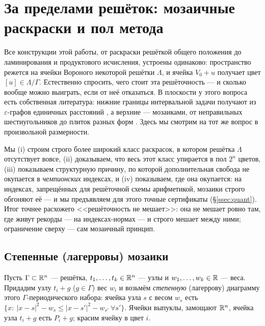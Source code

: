 \section{За пределами решёток: мозаичные раскраски и пол метода}
\label{sec:tilings}

Все конструкции этой работы, от раскраски решёткой общего положения до
ламинирования и продуктового исчисления, устроены одинаково: пространство
режется на ячейки Вороного некоторой решётки $\Lambda$, и ячейка
$V_0+u$ получает цвет $[u]\in\Lambda/\Gamma$. Естественно спросить, чего стоит
эта решёточность --- и сколько вообще можно выиграть, если от неё отказаться.
В плоскости у этого вопроса есть собственная литература: нижние границы
интервальной задачи получают из $\varepsilon$-графов единичных расстояний
\cite{Exoo2005,ChJW,Parts2023}, а верхние --- мозаиками, от неправильных
шестиугольников \cite{deGreyParts} до плиток разных форм \cite{Parts2023}.
Здесь мы смотрим на тот же вопрос в произвольной размерности.

Мы (i) строим строго более широкий класс раскрасок, в котором решётка
$\Lambda$ отсутствует вовсе, (ii) доказываем, что весь этот класс упирается в
пол $2^n$ цветов, (iii) показываем структурную причину, по которой
дополнительная свобода не окупается в \emph{чемпионских} индексах, и
(iv) показываем, где она окупается: на индексах, запрещённых для решёточной
схемы арифметикой, мозаики строго обгоняют её --- и мы предъявляем для этого
точные сертификаты (\S\ref{ssec:quant}). Итог точнее расхожего <<решёточность
не мешает>>: она не мешает ровно там, где живут рекорды --- на индексах-нормах
--- и строго мешает между ними; ограничение сверху --- сам мозаичный принцип.

\subsection{Степенные (лагерровы) мозаики}
\label{ssec:power}

\begin{definition}\label{def:tiling}
Пусть $\Gamma\subset\mathbb{R}^n$ --- решётка, $t_1,\dots,t_k\in\mathbb{R}^n$ --- узлы и
$w_1,\dots,w_k\in\mathbb{R}$ --- веса. Придадим узлу $t_i+g$ ($g\in\Gamma$) вес $w_i$ и
возьмём \emph{степенную} (лагеррову) диаграмму этого $\Gamma$-периодического
набора: ячейка узла $s$ с весом $w_s$ есть
$\{x:\ |x-s|^2-w_s\le|x-s'|^2-w_{s'}\ \forall s'\}$. Ячейки выпуклы, замощают
$\mathbb{R}^n$, ячейка узла $t_i+g$ есть $P_i+g$; красим ячейку в цвет $i$.
\end{definition}

